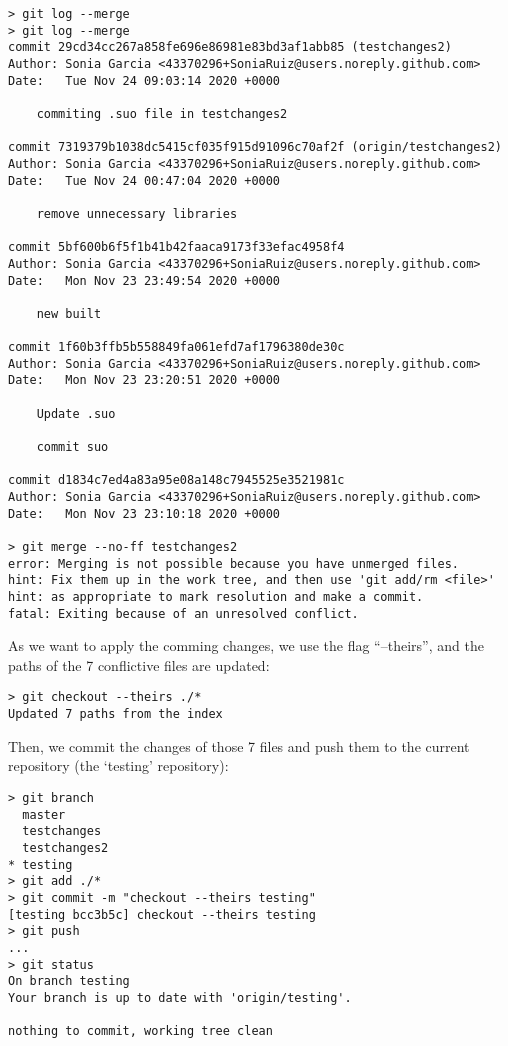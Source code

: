 \documentclass[]{book}
\begin{document}
\begin{verbatim}
> git log --merge
> git log --merge
commit 29cd34cc267a858fe696e86981e83bd3af1abb85 (testchanges2)
Author: Sonia Garcia <43370296+SoniaRuiz@users.noreply.github.com>
Date:   Tue Nov 24 09:03:14 2020 +0000

    commiting .suo file in testchanges2

commit 7319379b1038dc5415cf035f915d91096c70af2f (origin/testchanges2)
Author: Sonia Garcia <43370296+SoniaRuiz@users.noreply.github.com>
Date:   Tue Nov 24 00:47:04 2020 +0000

    remove unnecessary libraries

commit 5bf600b6f5f1b41b42faaca9173f33efac4958f4
Author: Sonia Garcia <43370296+SoniaRuiz@users.noreply.github.com>
Date:   Mon Nov 23 23:49:54 2020 +0000

    new built

commit 1f60b3ffb5b558849fa061efd7af1796380de30c
Author: Sonia Garcia <43370296+SoniaRuiz@users.noreply.github.com>
Date:   Mon Nov 23 23:20:51 2020 +0000

    Update .suo

    commit suo

commit d1834c7ed4a83a95e08a148c7945525e3521981c
Author: Sonia Garcia <43370296+SoniaRuiz@users.noreply.github.com>
Date:   Mon Nov 23 23:10:18 2020 +0000

> git merge --no-ff testchanges2
error: Merging is not possible because you have unmerged files.
hint: Fix them up in the work tree, and then use 'git add/rm <file>'
hint: as appropriate to mark resolution and make a commit.
fatal: Exiting because of an unresolved conflict.
\end{verbatim}

As we want to apply the comming changes, we use the flag ``--theirs'',
and the paths of the 7 conflictive files are updated:

\begin{verbatim}
> git checkout --theirs ./*
Updated 7 paths from the index
\end{verbatim}

Then, we commit the changes of those 7 files and push them to the
current repository (the `testing' repository):

\begin{verbatim}
> git branch
  master
  testchanges
  testchanges2
* testing
> git add ./*
> git commit -m "checkout --theirs testing"
[testing bcc3b5c] checkout --theirs testing
> git push
...
> git status
On branch testing
Your branch is up to date with 'origin/testing'.

nothing to commit, working tree clean
\end{verbatim}
\end{document}
